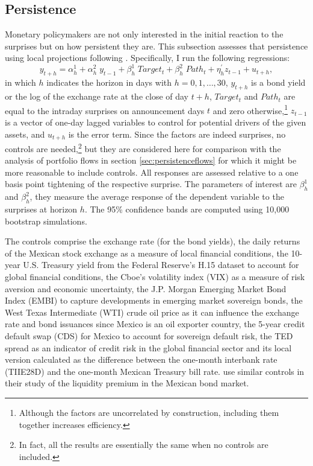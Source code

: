 \documentclass[a4paper, 12pt]{article}
\providecommand{\idxt}{t}
\providecommand{\idxh}{h}
\providecommand{\idxsfwd}{\idxt+\idxh}
\providecommand{\idxslag}{\idxt-1}
\providecommand{\yld}{y}
\providecommand{\ctrls}{z}
\providecommand{\rtdonereg}{Target_{\idxt}}
\providecommand{\rtdtworeg}{Path_{\idxt}}
\newcommand{\eqLPrhs}{\beta^{1}_{\idxh} \; \rtdonereg +  \beta^{2}_{\idxh} \; \rtdtworeg + \eta^{'}_{\idxh} \ctrls_{\idxslag}  + u_{\idxsfwd}}
\newcommand{\eqLPprices}{\yld_{\idxsfwd} = \alpha^{1}_{\idxh} + \alpha^{2}_{\idxh} \; \yld_{\idxslag} + \eqLPrhs}
\begin{document}
\subsection{Persistence} \label{sec:persistencefxyc}
Monetary policymakers are not only interested in the initial reaction to the surprises but on how persistent they are. 
This subsection assesses that persistence using local projections following \textcite{Jorda:2005}. Specifically, I run the following regressions: 
\begin{equation} \label{eq:nLPprices}
	\eqLPprices,
\end{equation}
\noindent in which \(\idxh\) indicates the horizon in days with \(\idxh = 0, 1, \ldots, 30\), \(\yld_{\idxsfwd}\) is a bond yield or the log of the exchange rate at the close of day \(\idxsfwd\), \(\rtdonereg\) and \(\rtdtworeg\) are equal to the intraday surprises on announcement days \(\idxt\) and zero otherwise,\footnote{Although the factors are uncorrelated by construction, including them together increases efficiency.} \(\ctrls_{\idxslag}\) is a vector of one-day lagged variables to control for potential drivers of the given assets, and \(u_{\idxsfwd}\) is the error term. 
Since the factors are indeed surprises, no controls are needed,\footnote{In fact, all the results are essentially the same when no controls are included.}  
but they are considered here for comparison with the analysis of portfolio flows in section \ref{sec:persistenceflows} for which it might be more reasonable to include controls. 
All responses are assessed relative to a one basis point tightening of the respective surprise. 
The parameters of interest are \(\beta^{1}_{\idxh}\) and \(\beta^{2}_{\idxh}\), they measure the average response of the dependent variable to the surprises at horizon \(\idxh\).
The 95\% confidence bands are computed using 10,000 bootstrap simulations.

The controls comprise the exchange rate (for the bond yields), the daily returns of the Mexican stock exchange as a measure of local financial conditions, 
the 10-year U.S. Treasury yield from the Federal Reserve’s H.15 dataset to account for global financial conditions, 
the Cboe's volatility index (VIX) as a measure of risk aversion and economic uncertainty, 
the J.P. Morgan Emerging Market Bond Index (EMBI) to capture developments in emerging market sovereign bonds, 
the West Texas Intermediate (WTI) crude oil price as it can influence the exchange rate and bond issuances since Mexico is an oil exporter country, 
the 5-year credit default swap (CDS) for Mexico to account for sovereign default risk, 
the TED spread as an indicator of credit risk in the global financial sector and 
its local version calculated as the difference between the one-month interbank rate (TIIE28D) and the one-month Mexican Treasury bill rate. 
\textcite{CFS:2021} use similar controls in their study of the liquidity premium in the Mexican bond market.
\end{document}
